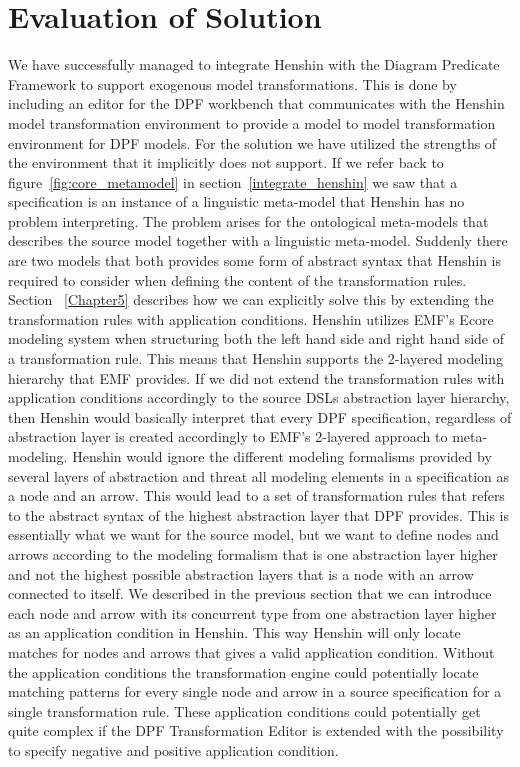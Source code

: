 \section{Evaluation of Solution}
\label{evaluate_solution}
We have successfully managed to integrate Henshin with the Diagram Predicate
Framework to support exogenous model transformations. This is done by including
an editor for the DPF workbench that communicates with the Henshin model
transformation environment to provide a model to model transformation
environment for DPF models. For the solution
we have utilized the strengths of the environment that it implicitly does not
support. If we refer back to figure~\ref{fig:core_metamodel} in
section~\ref{integrate_henshin} we saw that a specification is an instance of a
linguistic meta-model that Henshin has no problem interpreting. The problem
arises for the ontological meta-models that describes the source model together
with a linguistic meta-model. Suddenly there are two models that both provides
some form of abstract syntax that Henshin is required to consider when defining
the content of the transformation rules. Section ~\ref{Chapter5} describes how
we can explicitly solve this by extending the transformation rules with
application conditions. Henshin utilizes EMF's Ecore modeling system when
structuring both the left hand side and right hand side of a transformation
rule. This means that Henshin supports the 2-layered modeling hierarchy that
EMF provides. If we did not extend the transformation rules with application
conditions accordingly to the source DSLs abstraction layer hierarchy, then
Henshin would basically interpret that every DPF specification, regardless of
abstraction layer is created accordingly to EMF's 2-layered approach to
meta-modeling. Henshin would ignore the different modeling formalisms
provided by several layers of abstraction and threat all modeling elements in a
specification as a node and an arrow. This would lead to a set of
transformation rules that refers to the abstract syntax of the highest
abstraction layer that DPF provides. This is essentially what we want for the
source model, but we want to define nodes and arrows according to the modeling
formalism that is one abstraction layer higher and not the highest possible
abstraction layers that is a node with an arrow connected to itself. We
described in the previous section that we can introduce each node and arrow
with its concurrent type from one abstraction layer higher as an application
condition in Henshin. This way Henshin will only locate matches for nodes and
arrows that gives a valid application condition. Without the application
conditions the transformation engine could potentially locate matching patterns
for every single node and arrow in a source specification for a single
transformation rule. These application conditions could potentially get quite
complex if the DPF Transformation Editor is extended with the possibility to
specify negative and positive application condition. 

